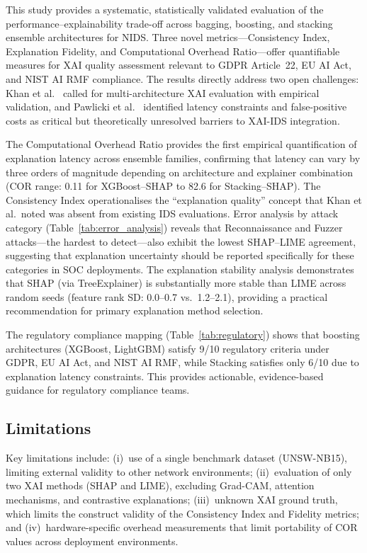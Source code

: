 \documentclass[conference]{IEEEtran}
\begin{document}
This study provides a systematic, statistically validated evaluation of the performance--explainability trade-off across bagging, boosting, and stacking ensemble architectures for NIDS. Three novel metrics---Consistency Index, Explanation Fidelity, and Computational Overhead Ratio---offer quantifiable measures for XAI quality assessment relevant to GDPR Article~22, EU AI Act, and NIST AI RMF compliance. The results directly address two open challenges: Khan et al.\ \cite{khan2025} called for multi-architecture XAI evaluation with empirical validation, and Pawlicki et al.\ \cite{pawlicki2024} identified latency constraints and false-positive costs as critical but theoretically unresolved barriers to XAI-IDS integration.

The Computational Overhead Ratio provides the first empirical quantification of explanation latency across ensemble families, confirming that latency can vary by three orders of magnitude depending on architecture and explainer combination (COR range: 0.11 for XGBoost--SHAP to 82.6 for Stacking--SHAP). The Consistency Index operationalises the ``explanation quality'' concept that Khan et al.\ noted was absent from existing IDS evaluations. Error analysis by attack category (Table~\ref{tab:error_analysis}) reveals that Reconnaissance and Fuzzer attacks---the hardest to detect---also exhibit the lowest SHAP--LIME agreement, suggesting that explanation uncertainty should be reported specifically for these categories in SOC deployments. The explanation stability analysis demonstrates that SHAP (via TreeExplainer) is substantially more stable than LIME across random seeds (feature rank SD: 0.0--0.7 vs.\ 1.2--2.1), providing a practical recommendation for primary explanation method selection.

The regulatory compliance mapping (Table~\ref{tab:regulatory}) shows that boosting architectures (XGBoost, LightGBM) satisfy 9/10 regulatory criteria under GDPR, EU AI Act, and NIST AI RMF, while Stacking satisfies only 6/10 due to explanation latency constraints. This provides actionable, evidence-based guidance for regulatory compliance teams.

\subsection{Limitations}

Key limitations include: (i)~use of a single benchmark dataset (UNSW-NB15), limiting external validity to other network environments; (ii)~evaluation of only two XAI methods (SHAP and LIME), excluding Grad-CAM, attention mechanisms, and contrastive explanations; (iii)~unknown XAI ground truth, which limits the construct validity of the Consistency Index and Fidelity metrics; and (iv)~hardware-specific overhead measurements that limit portability of COR values across deployment environments.
\end{document}
